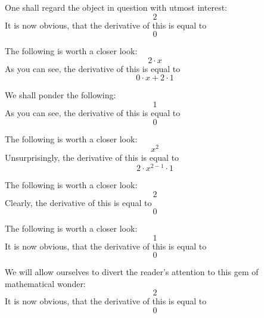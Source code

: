\documentclass{article}
\begin{document}
One shall regard the object in question with utmost interest:
\begin{equation}
2 
\end{equation}
It is now obvious, that the derivative of this is equal to
\begin{equation}
0 
\end{equation}

The following is worth a closer look:
\begin{equation}
2 \cdot x 
\end{equation}
As you can see, the derivative of this is equal to
\begin{equation}
0 \cdot x + 2 \cdot 1 
\end{equation}

We shall ponder the following:
\begin{equation}
1 
\end{equation}
As you can see, the derivative of this is equal to
\begin{equation}
0 
\end{equation}

The following is worth a closer look:
\begin{equation}
x ^{2 } 
\end{equation}
Unsurprisingly, the derivative of this is equal to
\begin{equation}
2 \cdot x ^{2 - 1 } \cdot 1 
\end{equation}

The following is worth a closer look:
\begin{equation}
2 
\end{equation}
Clearly, the derivative of this is equal to
\begin{equation}
0 
\end{equation}

The following is worth a closer look:
\begin{equation}
1 
\end{equation}
It is now obvious, that the derivative of this is equal to
\begin{equation}
0 
\end{equation}

We will allow ourselves to divert the reader's attention to this gem of mathematical wonder:
\begin{equation}
2 
\end{equation}
It is now obvious, that the derivative of this is equal to
\begin{equation}
0 
\end{equation}
\end{document}
